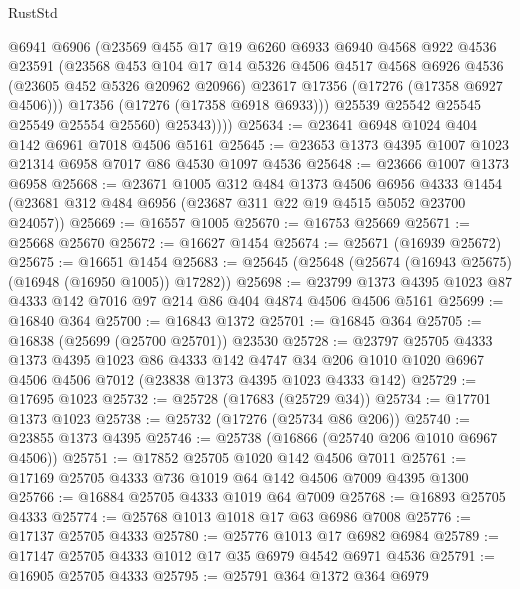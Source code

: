 \begin{lexlean}{RustStd}
\begin{coremodule}
              @6941
              @6906
              (@23569
                @455
                @17
                @19
                @6260
                @6933
                @6940
                @4568
                @922
                @4536
                @23591
                (@23568
                  @453
                  @104
                  @17
                  @14
                  @5326
                  @4506
                  @4517
                  @4568
                  @6926
                  @4536
                  (@23605 @452 @5326 @20962 @20966)
                  @23617
                  @17356
                  (@17276 (@17358 @6927 @4506)))
                @17356
                (@17276 (@17358 @6918 @6933)))
              @25539
              @25542
              @25545
              @25549
              @25554
              @25560)
            @25343))))
@25634 := @23641 @6948 @1024 @404 @142 @6961 @7018 @4506 @5161
@25645 := @23653 @1373 @4395 @1007 @1023 @21314 @6958 @7017 @86 @4530 @1097 @4536
@25648 := @23666 @1007 @1373 @6958
@25668 := @23671
    @1005
    @312
    @484
    @1373
    @4506
    @6956
    @4333
    @1454
    (@23681 @312 @484 @6956 (@23687 @311 @22 @19 @4515 @5052 @23700 @24057))
@25669 := @16557 @1005
@25670 := @16753 @25669
@25671 := @25668 @25670
@25672 := @16627 @1454
@25674 := @25671 (@16939 @25672)
@25675 := @16651 @1454
@25683 := @25645 (@25648 (@25674 (@16943 @25675) (@16948 (@16950 @1005)) @17282))
@25698 := @23799 @1373 @4395 @1023 @87 @4333 @142 @7016 @97 @214 @86 @404 @4874 @4506 @4506 @5161
@25699 := @16840 @364
@25700 := @16843 @1372
@25701 := @16845 @364
@25705 := @16838 (@25699 (@25700 @25701)) @23530
@25728 := @23797
    @25705
    @4333
    @1373
    @4395
    @1023
    @86
    @4333
    @142
    @4747
    @34
    @206
    @1010
    @1020
    @6967
    @4506
    @4506
    @7012
    (@23838 @1373 @4395 @1023 @4333 @142)
@25729 := @17695 @1023
@25732 := @25728 (@17683 (@25729 @34))
@25734 := @17701 @1373 @1023
@25738 := @25732 (@17276 (@25734 @86 @206))
@25740 := @23855 @1373 @4395
@25746 := @25738 (@16866 (@25740 @206 @1010 @6967 @4506))
@25751 := @17852 @25705 @1020 @142 @4506 @7011
@25761 := @17169 @25705 @4333 @736 @1019 @64 @142 @4506 @7009 @4395 @1300
@25766 := @16884 @25705 @4333 @1019 @64 @7009
@25768 := @16893 @25705 @4333
@25774 := @25768 @1013 @1018 @17 @63 @6986 @7008
@25776 := @17137 @25705 @4333
@25780 := @25776 @1013 @17 @6982 @6984
@25789 := @17147 @25705 @4333 @1012 @17 @35 @6979 @4542 @6971 @4536
@25791 := @16905 @25705 @4333
@25795 := @25791 @364 @1372 @364 @6979

\end{coremodule}
\end{lexlean}
